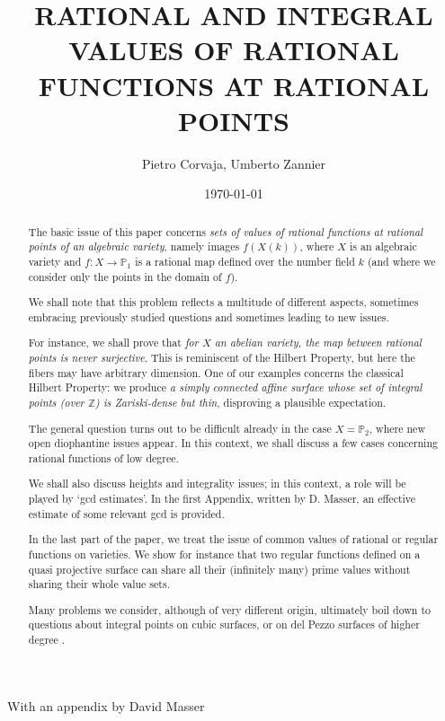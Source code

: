 \documentclass[leqno,12pt]{article} %
\author{Pietro Corvaja,  Umberto Zannier}
\title{\uppercase{Rational and integral values of rational functions at rational points}}
\date{\today}
\def\Z{{{\mathbb Z}}}
\def\P{{{\mathbb P}}}
\theoremstyle{plain} %
\theoremstyle{definition} %
\begin{document}
\maketitle

\centerline{With an appendix by David Masser}



\begin{abstract}
 
 The basic issue of this paper concerns  {\it sets of values of rational functions at  rational points of  an  algebraic  variety}, namely images $f(X(k))$, where $X$ is an  algebraic variety and  $f:X\to \P_1$ is a rational map defined over the number field $k$ (and where we consider only the points in the domain of $f$).  
 
 We shall note that this problem reflects a multitude of different aspects, sometimes embracing previously studied questions and sometimes leading to new issues. 
 
For instance, we shall prove that {\it  for $X$ an abelian variety, the map between rational points is never surjective}. This is reminiscent of the Hilbert Property, but here the fibers may have arbitrary dimension. One of our examples concerns the classical Hilbert Property:  we produce {\it a simply connected affine surface whose set of integral points (over $\Z$)  is  Zariski-dense  but thin}, disproving a plausible expectation.
 

The general question turns out to be difficult already in the case $X=\P_2$, where   new open diophantine issues appear. In this context, we shall discuss a few cases concerning rational functions of low degree. 

 
We shall also discuss heights and integrality issues; in this context, a role will be played by `gcd estimates'. 
  In the first Appendix, written by D. Masser, an effective estimate of some relevant gcd is provided.

 In the last part of the paper, we treat the issue of common values of rational or regular functions on varieties. We show for instance that two regular functions defined on a quasi projective surface can share all their (infinitely many) prime values without sharing  their whole value sets.
 
Many  problems we consider, although of very different origin, ultimately boil down to questions about integral points on cubic surfaces, or on del Pezzo surfaces of higher degree .
\end{abstract}
\end{document}
